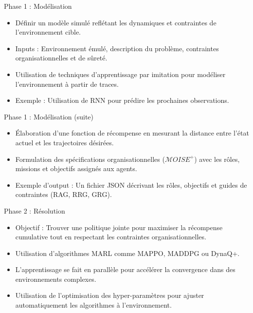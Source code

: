 \documentclass{beamer}
\begin{document}
\begin{frame}{Phase 1 : Modélisation}
    \begin{itemize}
        \item Définir un modèle simulé reflétant les dynamiques et contraintes de l'environnement cible.
        \item Inputs : Environnement émulé, description du problème, contraintes organisationnelles et de sûreté.
        \item Utilisation de techniques d'apprentissage par imitation pour modéliser l'environnement à partir de traces.
        \item Exemple : Utilisation de RNN pour prédire les prochaines observations.
    \end{itemize}
\end{frame}

\begin{frame}{Phase 1 : Modélisation (suite)}
    \begin{itemize}
        \item Élaboration d'une fonction de récompense en mesurant la distance entre l'état actuel et les trajectoires désirées.
        \item Formulation des spécifications organisationnelles ($\mathcal{M}OISE^+$) avec les rôles, missions et objectifs assignés aux agents.
        \item Exemple d'output : Un fichier JSON décrivant les rôles, objectifs et guides de contraintes (RAG, RRG, GRG).
    \end{itemize}
\end{frame}

\begin{frame}{Phase 2 : Résolution}
    \begin{itemize}
        \item Objectif : Trouver une politique jointe pour maximiser la récompense cumulative tout en respectant les contraintes organisationnelles.
        \item Utilisation d'algorithmes MARL comme MAPPO, MADDPG ou DynaQ+.
        \item L'apprentissage se fait en parallèle pour accélérer la convergence dans des environnements complexes.
        \item Utilisation de l'optimisation des hyper-paramètres pour ajuster automatiquement les algorithmes à l'environnement.
    \end{itemize}
\end{frame}
\end{document}
